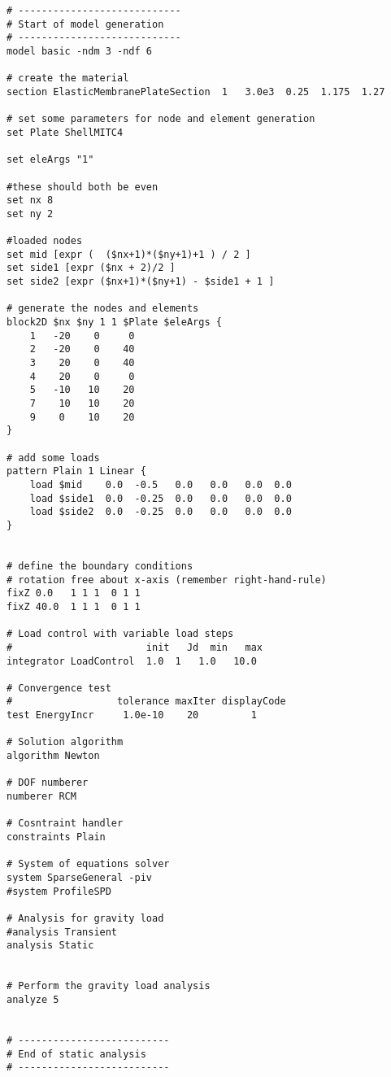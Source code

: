 \documentclass[12pt]{article}
\begin{document}
\vspace{0.2in} 
{\sf\small
\begin{verbatim}
# ----------------------------
# Start of model generation
# ----------------------------
model basic -ndm 3 -ndf 6

# create the material
section ElasticMembranePlateSection  1   3.0e3  0.25  1.175  1.27

# set some parameters for node and element generation
set Plate ShellMITC4

set eleArgs "1"

#these should both be even
set nx 8
set ny 2

#loaded nodes
set mid [expr (  ($nx+1)*($ny+1)+1 ) / 2 ]
set side1 [expr ($nx + 2)/2 ] 
set side2 [expr ($nx+1)*($ny+1) - $side1 + 1 ]

# generate the nodes and elements
block2D $nx $ny 1 1 $Plate $eleArgs {
    1   -20    0     0
    2   -20    0    40
    3    20    0    40
    4    20    0     0
    5   -10   10    20 
    7    10   10    20   
    9    0    10    20 
} 

# add some loads
pattern Plain 1 Linear {
    load $mid    0.0  -0.5   0.0   0.0   0.0  0.0
    load $side1  0.0  -0.25  0.0   0.0   0.0  0.0
    load $side2  0.0  -0.25  0.0   0.0   0.0  0.0
}


# define the boundary conditions
# rotation free about x-axis (remember right-hand-rule)
fixZ 0.0   1 1 1  0 1 1
fixZ 40.0  1 1 1  0 1 1   

# Load control with variable load steps
#                       init   Jd  min   max
integrator LoadControl  1.0  1   1.0   10.0

# Convergence test
#                  tolerance maxIter displayCode
test EnergyIncr     1.0e-10    20         1

# Solution algorithm
algorithm Newton

# DOF numberer
numberer RCM

# Cosntraint handler
constraints Plain 

# System of equations solver
system SparseGeneral -piv
#system ProfileSPD

# Analysis for gravity load
#analysis Transient 
analysis Static 


# Perform the gravity load analysis
analyze 5


# --------------------------
# End of static analysis
# --------------------------


\end{verbatim}}
\end{document}
